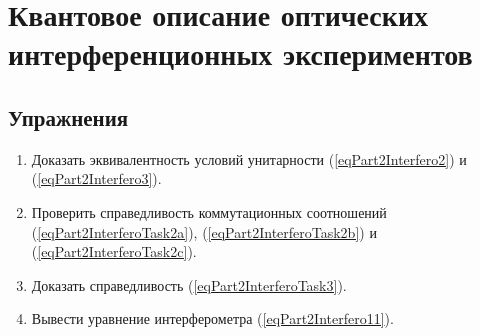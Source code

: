 \chapter{Квантовое описание оптических интерференционных экспериментов}
\label{chInterfero}





\section{Упражнения}
\begin{enumerate}
\item Доказать эквивалентность условий унитарности
  (\ref{eqPart2Interfero2}) и  (\ref{eqPart2Interfero3}).
\item Проверить справедливость коммутационных соотношений
  (\ref{eqPart2InterferoTask2a}), (\ref{eqPart2InterferoTask2b}) и
  (\ref{eqPart2InterferoTask2c}). 
\item Доказать справедливость (\ref{eqPart2InterferoTask3}).
\item Вывести уравнение интерферометра (\ref{eqPart2Interfero11}).
\end{enumerate}

